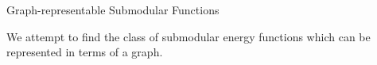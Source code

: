 \documentclass{article}
\begin{document}
\large{Graph-representable Submodular Functions}

We attempt to find the class of submodular energy functions which can be represented in terms of a graph.
\end{document}
